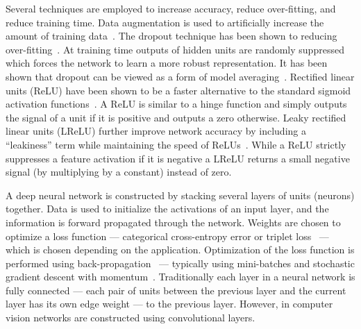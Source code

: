     Several techniques are employed to increase accuracy, reduce over-fitting,  and reduce training time.
    Data augmentation is used to artificially increase the amount of training
      data~\cite{ciresan_multi_column_2012, ciresan_high_performance_2011, simard_best_2003}.
    The dropout technique has been shown to reducing over-fitting~\cite{dahl_improving_2013,
      srivastava_dropout_2014}.
    At training time outputs of hidden units are randomly suppressed which forces the network to learn a more
      robust representation.
    It has been shown that dropout can be viewed as a form of model averaging~\cite{hinton_improving_2012}.
    Rectified linear units (ReLU) have been shown to be a faster alternative to the standard sigmoid activation
      functions~\cite{vinod_rectified_2010, dahl_improving_2013}.
    A ReLU is similar to a hinge function and simply outputs the signal of a unit if it is positive and outputs a
      zero otherwise.
    Leaky rectified linear units (LReLU) further improve network accuracy by including a ``leakiness'' term while
      maintaining the speed of ReLUs~\cite{maas_rectifier_2013}.
    While a ReLU strictly suppresses a feature activation if it is negative a LReLU returns a small negative
      signal (by multiplying by a constant) instead of zero.

    A deep neural network is constructed by stacking several layers of units (neurons) together. Data is used to
    initialize the activations of an input layer, and the information is forward propagated through the network.
    Weights are chosen to optimize a loss function --- \eg{} categorical cross-entropy error or triplet
    loss~\cite{schroff_facenet_2015} --- which is chosen depending on the application. Optimization of the loss
    function is performed using back-propagation~\cite{rumelhart_learning_1986} --- typically using mini-batches
    and stochastic gradient descent with momentum~\cite{sutskever_importance_2013}. Traditionally each layer in a
    neural network is fully connected --- each pair of units between the previous layer and the current layer has
    its own edge weight ---  to the previous layer. However, in computer vision networks are constructed using
    convolutional layers.

